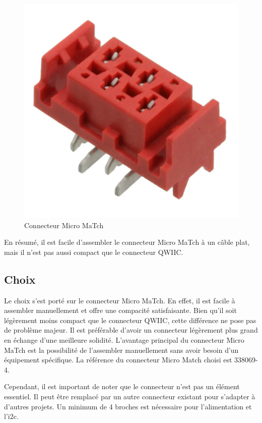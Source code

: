 \begin{figure}[H]
    \centering
    \includegraphics[scale=0.08]{./assets/figures/micromatch.png}
    \caption{\cite{micromatch} Connecteur Micro MaTch}
\end{figure}

En résumé, il est facile d'assembler le connecteur Micro MaTch à un câble plat, mais il n'est pas aussi compact que le connecteur QWIIC.

\subsection{Choix}

Le choix s'est porté sur le connecteur Micro MaTch.
En effet, il est facile à assembler manuellement et offre une compacité satisfaisante.
Bien qu'il soit légèrement moins compact que le connecteur QWIIC, cette différence ne pose pas de problème majeur.
Il est préférable d'avoir un connecteur légèrement plus grand en échange d'une meilleure solidité.
L'avantage principal du connecteur Micro MaTch est la possibilité de l'assembler manuellement sans avoir besoin d'un équipement spécifique.
La référence du connecteur Micro Match choisi est 338069-4.

Cependant, il est important de noter que le connecteur n'est pas un élément essentiel. Il peut être remplacé par un autre connecteur existant pour s'adapter à d'autres projets. Un minimum de 4 broches est nécessaire pour l'alimentation et l'\gls{i2c}.

